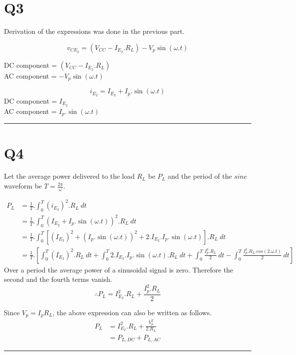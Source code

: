 \documentclass[a4paper,11pt]{article}%
\begin{document}
\pagebreak
\section*{Q3}

Derivation of the expressions was done in the previous part.

\[v_{CE_2}= \left(V_{CC} - I_{E_2}.R_L \right) - V_p\sin(\omega.t)\]

DC component = $\left(V_{CC} - I_{E_2}.R_L \right)$\\
AC component = $- V_p\sin(\omega.t)$


\[ i_{E_2} = I_{E_2} + I_p.\sin(\omega.t)\]
DC component = $I_{E_2}$\\
AC component = $I_p.\sin(\omega.t)$
\vspace{5mm}

\hrule
\section*{Q4}
Let the average power delivered to the load $R_L$ be $P_L$ and the period of the $sine$ waveform be $T = \frac{2\pi}{\omega}$.

\[
\begin{split}
	P_L &= \frac{1}{T} .\int_0^T (i_{E_2})^2.R_L ~dt\\
	& = \frac{1}{T} .\int_0^T (I_{E_2} + I_p.\sin(\omega.t))^2.R_L ~dt\\
	&=  \frac{1}{T} .\int_0^T \left[  (I_{E_2})^2 + (I_p.\sin(\omega.t))^2 + 2.I_{E_2}.I_p.\sin(\omega.t) \right].R_L~dt\\
	&=  \frac{1}{T} .\left[ \int_0^T (I_{E_2})^2.R_L~dt + 	 \int_0^T 2.I_{E_2}.I_p.\sin(\omega.t).R_L~dt + \int_0^T \frac{I_p^2.R_L}{2}~dt - \int_0^T \frac{I_p^2.R_L.cos(2.\omega.t)}{2}~dt \right]
\end{split}
\]
Over a period the average power of a sinusoidal signal is zero. Therefore the second and the fourth terms vanish.
\[\therefore P_L = I_{E_2}^2.R_L + \frac{I_p^2.R_L}{2}\]

Since $ V_p = I_pR_L$, the above expression can also be written as follows.
\[ 
\begin{split}
	P_L &= I_{E_2}^2.R_L + \frac{V_p^2}{2.R_L}\\
	& = P_{L,DC} + P_{L,AC}
\end{split}
 \]



\hrule
\end{document}

